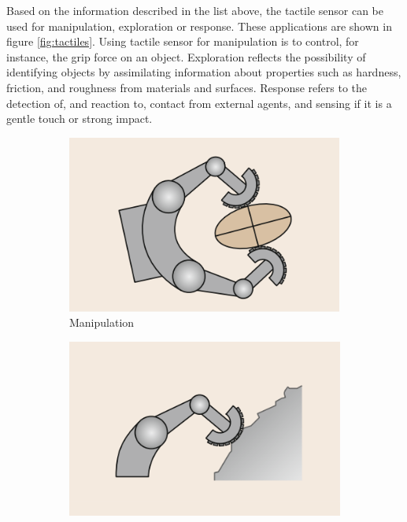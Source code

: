 \documentclass[USenglish]{ifimaster}  %
\begin{document}
Based on the information described in the list above, the tactile sensor can be used for manipulation, exploration or response. These applications are shown in figure \ref{fig:tactiles}. Using tactile sensor for manipulation is to control, for instance, the grip force on an object. Exploration reflects the possibility of identifying objects by assimilating information about properties such as hardness, friction, and roughness from materials and surfaces. Response refers to the detection of, and reaction to, contact from external agents, and sensing if it is a gentle touch or strong impact.

	\begin{figure}
	\centering
	\begin{subfigure}[b]{0.32\textwidth}
		\centering
		\includegraphics[width=\linewidth]{Figures/tactiles1}
		\caption{Manipulation}
		\label{fig:tact1}
	\end{subfigure}\hfill
	\begin{subfigure}[b]{0.32\textwidth}
		\centering
		\includegraphics[width=\linewidth]{Figures/tactiles2}

\end{subfigure}
\end{figure}
\end{document}
